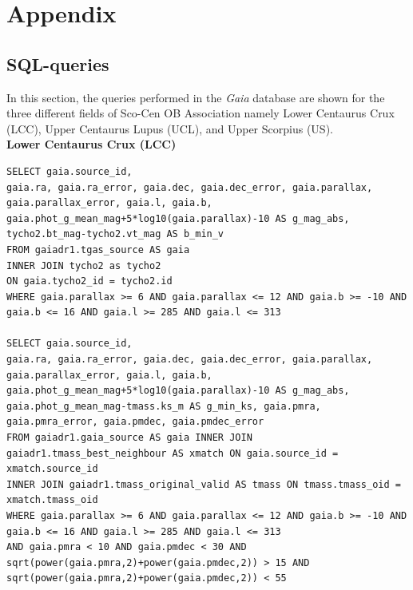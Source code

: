 \chapter{ \textbf{Appendix} }\label{ch:Appendix}
\vspace{0.5cm} 

\section{SQL-queries}\label{sec:SQL}
\lstset{language = SQL}

In this section, the queries performed in the \textit{Gaia} database are shown for the three different fields of Sco-Cen OB Association namely Lower Centaurus Crux (LCC), Upper Centaurus Lupus (UCL), and Upper Scorpius (US).\\    

\textbf{Lower Centaurus Crux (LCC)}
\begin{lstlisting}[frame = single]
SELECT gaia.source_id, 
gaia.ra, gaia.ra_error, gaia.dec, gaia.dec_error, gaia.parallax, gaia.parallax_error, gaia.l, gaia.b,
gaia.phot_g_mean_mag+5*log10(gaia.parallax)-10 AS g_mag_abs,
tycho2.bt_mag-tycho2.vt_mag AS b_min_v
FROM gaiadr1.tgas_source AS gaia
INNER JOIN tycho2 as tycho2
ON gaia.tycho2_id = tycho2.id
WHERE gaia.parallax >= 6 AND gaia.parallax <= 12 AND gaia.b >= -10 AND gaia.b <= 16 AND gaia.l >= 285 AND gaia.l <= 313

SELECT gaia.source_id, 
gaia.ra, gaia.ra_error, gaia.dec, gaia.dec_error, gaia.parallax, gaia.parallax_error, gaia.l, gaia.b, 
gaia.phot_g_mean_mag+5*log10(gaia.parallax)-10 AS g_mag_abs, 
gaia.phot_g_mean_mag-tmass.ks_m AS g_min_ks, gaia.pmra, gaia.pmra_error, gaia.pmdec, gaia.pmdec_error 
FROM gaiadr1.gaia_source AS gaia INNER JOIN gaiadr1.tmass_best_neighbour AS xmatch ON gaia.source_id = xmatch.source_id 
INNER JOIN gaiadr1.tmass_original_valid AS tmass ON tmass.tmass_oid = xmatch.tmass_oid 
WHERE gaia.parallax >= 6 AND gaia.parallax <= 12 AND gaia.b >= -10 AND gaia.b <= 16 AND gaia.l >= 285 AND gaia.l <= 313 
AND gaia.pmra < 10 AND gaia.pmdec < 30 AND sqrt(power(gaia.pmra,2)+power(gaia.pmdec,2)) > 15 AND sqrt(power(gaia.pmra,2)+power(gaia.pmdec,2)) < 55
\end{lstlisting}\vspace{5mm}

